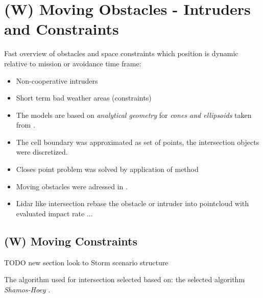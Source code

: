 \newpage
\section{(W) Moving Obstacles - Intruders and Constraints}\label{s:intruders}
    \noindent Fast overview of obstacles and space constraints which position is dynamic relative to mission or avoidance time frame:
    \begin{itemize}
        \item Non-cooperative intruders
        \item Short term bad weather areas (constraints)
        \item The models are based on \emph{analytical geometry} for \emph{cones and ellipsoids} taken from \cite{sommerville2016analytical}.
        \item The cell boundary was approximated as set of points, the intersection objects were discretized.
        \item Closes point problem \cite{shamos1975closest} was solved by application of method  \cite{bentley1980optimal}
		\item Moving obstacles were adressed in \cite{fiorini1998motion}.
		\item Lidar like intersection rebase the obstacle or intruder into pointcloud with evaluated impact rate ...
    \end{itemize}
    
\subsection{(W) Moving Constraints}\label{s:MovingVirtualConstraints}
TODO new section look to Storm scenario structure

The algorithm used for intersection selected based on:\citep{bentley1979algorithms} the selected algorithm  \emph{Shamos-Hoey} \cite{shamos1976geometric}.
